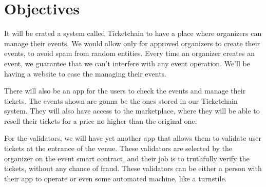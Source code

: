 \section{Objectives}

It will be crated a system called Ticketchain to have a place where organizers can manage their events. We would allow only for approved organizers to create their events, to avoid spam from random entities. Every time an organizer creates an event, we guarantee that we can't interfere with any event operation. We'll be having a website to ease the managing their events.

There will also be an app for the users to check the events and manage their tickets. The events shown are gonna be the ones stored in our Ticketchain system. They will also have access to the marketplace, where they will be able to resell their tickets for a price no higher than the original one.

For the validators, we will have yet another app that allows them to validate user tickets at the entrance of the venue. These validators are selected by the organizer on the event smart contract, and their job is to truthfully verify the tickets, without any chance of fraud. These validators can be either a person with their app to operate or even some automated machine, like a turnstile.

